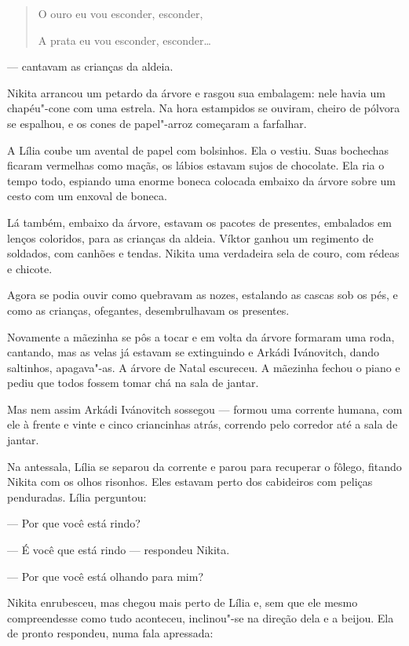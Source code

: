 \begin{quotation}
O ouro eu vou esconder, esconder,

A prata eu vou esconder, esconder\ldots{}
\end{quotation}

\noindent{}--- cantavam as crianças da aldeia.

Nikita arrancou um petardo da árvore e rasgou sua embalagem: nele
havia um chapéu"-cone com uma estrela. Na hora estampidos se ouviram,
cheiro de pólvora se espalhou, e os cones de papel"-arroz começaram a
farfalhar.

A Lília coube um avental de papel com bolsinhos. Ela o vestiu. Suas
bochechas ficaram vermelhas como maçãs, os lábios estavam sujos de
chocolate. Ela ria o tempo todo, espiando uma enorme boneca colocada embaixo da árvore sobre um cesto com um enxoval de boneca.

Lá também, embaixo da árvore, estavam os pacotes de presentes, embalados em lenços coloridos, para as crianças da aldeia.
Víktor ganhou um regimento de soldados, com canhões e tendas. Nikita uma
verdadeira sela de couro, com rédeas e chicote.

Agora se podia ouvir como quebravam as nozes, estalando as cascas sob os
pés, e como as crianças, ofegantes, desembrulhavam os presentes.

Novamente a mãezinha se pôs a tocar e em volta da árvore
formaram uma roda, cantando, mas as velas já estavam se extinguindo e
Arkádi Ivánovitch, dando saltinhos, apagava"-as. A árvore de Natal
escureceu. A mãezinha fechou o piano e pediu que todos fossem tomar chá
na sala de jantar.

Mas nem assim Arkádi Ivánovitch sossegou --- formou uma corrente humana,
com ele à frente e vinte e cinco criancinhas atrás, correndo pelo
corredor até a sala de jantar.

Na antessala, Lília se separou da corrente e parou para recuperar o
fôlego, fitando Nikita com os olhos risonhos. Eles estavam perto dos
cabideiros com peliças penduradas. Lília perguntou:

--- Por que você está rindo?

--- É você que está rindo --- respondeu Nikita.

--- Por que você está olhando para mim?

Nikita enrubesceu, mas chegou mais perto de Lília e, sem que ele mesmo
compreendesse como tudo aconteceu, inclinou"-se na direção dela e a
beijou. Ela de pronto respondeu, numa fala apressada:

